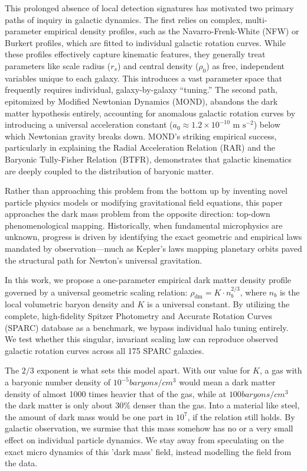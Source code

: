 \documentclass[twocolumn]{aastex631}
\begin{document}
This prolonged absence of local detection signatures has motivated two primary paths of inquiry in galactic dynamics. The first relies on complex, multi-parameter empirical density profiles, such as the Navarro-Frenk-White (NFW) or Burkert profiles, which are fitted to individual galactic rotation curves. While these profiles effectively capture kinematic features, they generally treat parameters like scale radius ($r_s$) and central density ($\rho_0$) as free, independent variables unique to each galaxy. This introduces a vast parameter space that frequently requires individual, galaxy-by-galaxy ``tuning.'' The second path, epitomized by Modified Newtonian Dynamics (MOND), abandons the dark matter hypothesis entirely, accounting for anomalous galactic rotation curves by introducing a universal acceleration constant ($a_0 \approx 1.2 \times 10^{-10} \text{ m s}^{-2}$) below which Newtonian gravity breaks down. MOND’s striking empirical success, particularly in explaining the Radial Acceleration Relation (RAR) and the Baryonic Tully-Fisher Relation (BTFR), demonstrates that galactic kinematics are deeply coupled to the distribution of baryonic matter.

Rather than approaching this problem from the bottom up by inventing novel particle physics models or modifying gravitational field equations, this paper approaches the dark mass problem from the opposite direction: top-down phenomenological mapping. Historically, when fundamental microphysics are unknown, progress is driven by identifying the exact geometric and empirical laws mandated by observation---much as Kepler’s laws mapping planetary orbits paved the structural path for Newton’s universal gravitation. 

In this work, we propose a one-parameter empirical dark matter density profile governed by a universal geometric scaling relation: $\rho_{\text{dm}} = K \cdot n_b^{2/3}$, where $n_b$ is the local volumetric baryon density and $K$ is a universal constant. By utilizing the complete, high-fidelity Spitzer Photometry and Accurate Rotation Curves (SPARC) database as a benchmark, we bypass individual halo tuning entirely. We test whether this singular, invariant scaling law can reproduce observed galactic rotation curves across all 175 SPARC galaxies. 

The $2/3$ exponent is what sets this model apart. With our value for $K$, a gas with a baryonic number density of $10^{-5} baryons/cm^3$ would mean a dark matter density of almost 1000 times heavier that of the gas, while at $100 baryons/cm^3$ the dark matter is only about $30\%$  denser than the gas. Into a material like steel, the amount of dark mass would be one part in $10^7$, if the relation still holds. By galactic observation, we surmise that this mass somehow has no or a very small effect on individual particle dynamics. We stay away from speculating on the exact micro dynamics of this 'dark mass' field, instead modelling the field from the data.   
\end{document}
